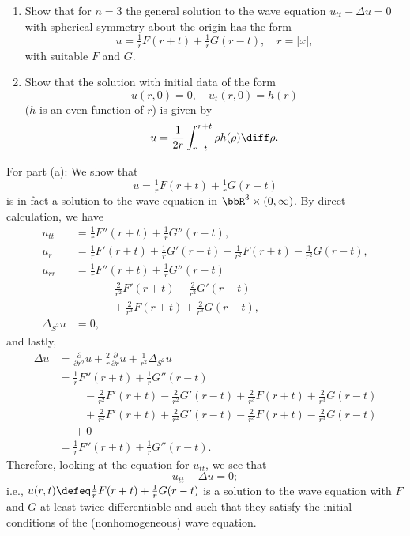 \begin{problem}
  \begin{enumerate}[label=(\alph*),noitemsep]
  \item Show that for \(n=3\) the general solution to the wave equation
    \(u_{tt}-\Delta u=0\) with spherical symmetry about the origin has the
    form
    \[
      u=\tfrac{1}{r}F(r+t)+\tfrac{1}{r}G(r-t),\quad r=|x|,
    \]
    with suitable \(F\) and \(G\).
  \item Show that the solution with initial data of the form
    \[
      u(r,0)=0,\quad u_t(r,0)=h(r)
    \]
    (\(h\) is an even function of \(r\)) is given by
    \[
      u=\frac{1}{2r}\int_{r-t}^{r+t} \rho h(\rho)\diff \rho.
    \]
  \end{enumerate}
\end{problem}
\begin{solution}
  For part (a): We show that
  \[
    u=\tfrac{1}{r}F(r+t)+\tfrac{1}{r}G(r-t)
  \]
  is in fact a solution to the wave equation in
  \(\bbR^3\times(0,\infty)\). By direct calculation, we have
  \begin{align*}
    u_{tt}%
    &=\tfrac{1}{r}F''(r+t)+\tfrac{1}{r}G''(r-t),\\
    u_{r}
    &=\tfrac{1}{r}F'(r+t)+\tfrac{1}{r}G'(r-t)
      -\tfrac{1}{r^2}F(r+t)-\tfrac{1}{r^2}G(r-t),\\
    u_{rr}
    &=\tfrac{1}{r}F''(r+t)+\tfrac{1}{r}G''(r-t)\\
    &\phantom{{}={}\quad}-\tfrac{2}{r^2}F'(r+t)-\tfrac{2}{r^2}G'(r-t)\\
    &\phantom{{}={}\qquad}+\tfrac{2}{r^3}F(r+t)+\tfrac{2}{r^3}G(r-t),\\
    \Delta_{S^2}u&=0,
  \end{align*}
  and lastly,
  \begin{align*}
    \Delta u%
    &=\tfrac{\partial}{\partial r^2}u%
      +\tfrac{2}{r}\tfrac{\partial}{\partial r}u%
      +\tfrac{1}{r^2}\Delta_{S^2} u\\
    &=\tfrac{1}{r}F''(r+t)+\tfrac{1}{r}G''(r-t)\\
    &\phantom{{}={}\quad}-\tfrac{2}{r^2}F'(r+t)-\tfrac{2}{r^2}G'(r-t)
    +\tfrac{2}{r^3}F(r+t)+\tfrac{2}{r^3}G(r-t)\\
    &\phantom{{}={}\quad}
      +\tfrac{2}{r^2}F'(r+t)+\tfrac{2}{r^2}G'(r-t)
      -\tfrac{2}{r^3}F(r+t)-\tfrac{2}{r^3}G(r-t)\\
    &\phantom{{}={}}+0\\
    &=\tfrac{1}{r}F''(r+t)+\tfrac{1}{r}G''(r-t).
  \end{align*}
  Therefore, looking at the equation for \(u_{tt}\), we see that
  \[
    u_{tt}-\Delta u=0;
  \]
  i.e., \(u(r,t)\defeq\frac{1}{r}F(r+t)+\frac{1}{r}G(r-t)\) is a solution
  to the wave equation with \(F\) and \(G\) at least twice differentiable
  and such that they satisfy the initial conditions of the (nonhomogeneous)
  wave equation.


\end{solution}
